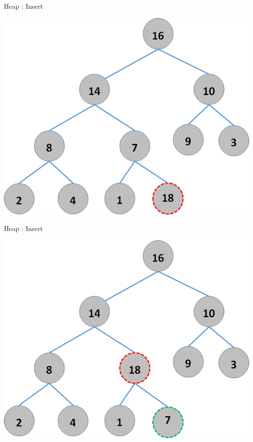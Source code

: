 \documentclass{beamer}
\begin{document}
\begin{frame}{Heap : Insert}
    \begin{center}
        \includegraphics[scale=0.5]{heapInsert2.png}
    \end{center}
\end{frame}


\begin{frame}{Heap : Insert}
    \begin{center}
        \includegraphics[scale=0.5]{heapInsert3.png}
    \end{center}
\end{frame}
\end{document}
